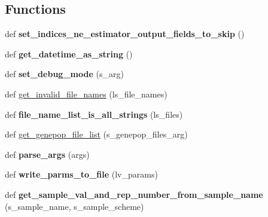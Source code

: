 \subsection*{Functions}
\begin{DoxyCompactItemize}
\item 
def {\bfseries set\+\_\+indices\+\_\+ne\+\_\+estimator\+\_\+output\+\_\+fields\+\_\+to\+\_\+skip} ()\hypertarget{namespacenegui_1_1pgdriveneestimator_afd1338775d832ffc8d84cc10c6d1815b}{}\label{namespacenegui_1_1pgdriveneestimator_afd1338775d832ffc8d84cc10c6d1815b}

\item 
def {\bfseries get\+\_\+datetime\+\_\+as\+\_\+string} ()\hypertarget{namespacenegui_1_1pgdriveneestimator_a2d64d88a4d4f63a1f8e0c71606942690}{}\label{namespacenegui_1_1pgdriveneestimator_a2d64d88a4d4f63a1f8e0c71606942690}

\item 
def {\bfseries set\+\_\+debug\+\_\+mode} (s\+\_\+arg)\hypertarget{namespacenegui_1_1pgdriveneestimator_aa1b949a1baced8ac2725ae493f7216d8}{}\label{namespacenegui_1_1pgdriveneestimator_aa1b949a1baced8ac2725ae493f7216d8}

\item 
def \hyperlink{namespacenegui_1_1pgdriveneestimator_a944008262ae2ee7c6fc796499be626ce}{get\+\_\+invalid\+\_\+file\+\_\+names} (ls\+\_\+file\+\_\+names)
\item 
def {\bfseries file\+\_\+name\+\_\+list\+\_\+is\+\_\+all\+\_\+strings} (ls\+\_\+files)\hypertarget{namespacenegui_1_1pgdriveneestimator_a25129002805e932c87b657a083173863}{}\label{namespacenegui_1_1pgdriveneestimator_a25129002805e932c87b657a083173863}

\item 
def \hyperlink{namespacenegui_1_1pgdriveneestimator_a15b09d2967ec4812353b0e146f074799}{get\+\_\+genepop\+\_\+file\+\_\+list} (s\+\_\+genepop\+\_\+files\+\_\+arg)
\item 
def {\bfseries parse\+\_\+args} (args)\hypertarget{namespacenegui_1_1pgdriveneestimator_a3a0c075de2bc7a0d00b1893128b189c8}{}\label{namespacenegui_1_1pgdriveneestimator_a3a0c075de2bc7a0d00b1893128b189c8}

\item 
def {\bfseries write\+\_\+parms\+\_\+to\+\_\+file} (lv\+\_\+params)\hypertarget{namespacenegui_1_1pgdriveneestimator_ac719f3780ff8c351f4c4295fcbbe3326}{}\label{namespacenegui_1_1pgdriveneestimator_ac719f3780ff8c351f4c4295fcbbe3326}

\item 
def {\bfseries get\+\_\+sample\+\_\+val\+\_\+and\+\_\+rep\+\_\+number\+\_\+from\+\_\+sample\+\_\+name} (s\+\_\+sample\+\_\+name, s\+\_\+sample\+\_\+scheme)\hypertarget{namespacenegui_1_1pgdriveneestimator_a3807e058c5f9e9e73eb6ecae5221853b}{}\label{namespacenegui_1_1pgdriveneestimator_a3807e058c5f9e9e73eb6ecae5221853b}


\end{DoxyCompactItemize}
